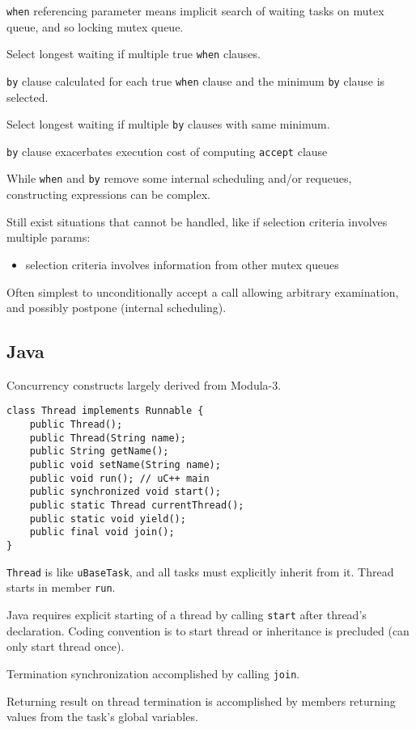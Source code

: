 \documentclass[11pt]{article}
\begin{document}
\texttt{when} referencing parameter means implicit search of waiting tasks on
mutex queue, and so locking mutex queue.

Select longest waiting if multiple true \texttt{when} clauses.

\texttt{by} clause calculated for each true \texttt{when} clause and the minimum \texttt{by}
clause is selected.

Select longest waiting if multiple \texttt{by} clauses with same minimum.

\texttt{by} clause exacerbates execution cost of computing \texttt{accept} clause

While \texttt{when} and \texttt{by} remove some internal scheduling and/or requeues,
constructing expressions can be complex.

Still exist situations that cannot be handled, like if selection criteria
involves multiple params:
\begin{itemize}
\item selection criteria involves information from other mutex queues
\end{itemize}

Often simplest to unconditionally accept a call allowing arbitrary examination,
and possibly postpone (internal scheduling).
\subsection{Java}
\label{sec:orgf7ace5e}
Concurrency constructs largely derived from Modula-3.
\begin{verbatim}
class Thread implements Runnable {
    public Thread();
    public Thread(String name);
    public String getName();
    public void setName(String name);
    public void run(); // uC++ main
    public synchronized void start();
    public static Thread currentThread();
    public static void yield();
    public final void join();
}
\end{verbatim}

\texttt{Thread} is like \texttt{uBaseTask}, and all tasks must explicitly inherit from it.
Thread starts in member \texttt{run}.

Java requires explicit starting of a thread by calling \texttt{start} after thread's
declaration.
Coding convention is to start thread or inheritance is precluded (can only
start thread once).

Termination synchronization accomplished by calling \texttt{join}.

Returning result on thread termination is accomplished by members returning
values from the task's global variables.
\end{document}
